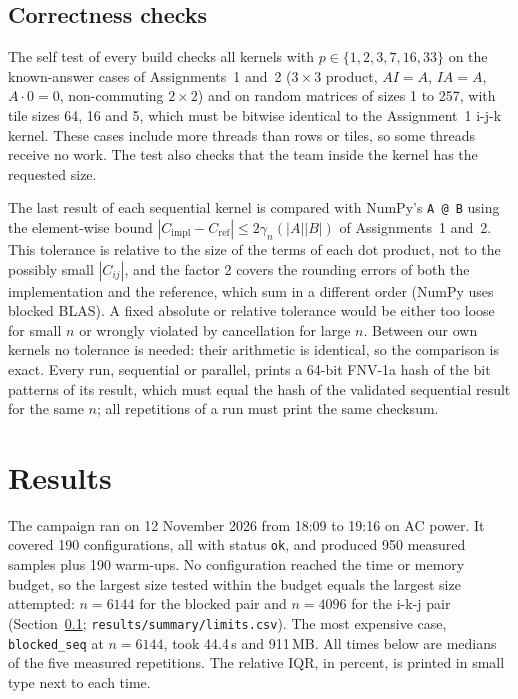 \documentclass[11pt,a4paper]{article}
\newcommand{\concept}[1]{\par\addvspace{8pt}\Needspace{5\baselineskip}%
  \noindent{\color{accent}\bfseries\boldmath #1}\par\nopagebreak\vspace{2pt}}
\begin{document}
\subsection{Correctness checks}\label{sec:correctmethod}
\concept{Before benchmarking}
The self test of every build checks all kernels with $p\in\{1,2,3,7,16,33\}$ on the
known-answer cases of Assignments~1 and~2 ($3\times3$ product, $AI=A$, $IA=A$, $A\cdot0=0$,
non-commuting $2\times2$) and on random matrices of sizes 1 to 257, with tile sizes 64, 16
and 5, which must be bitwise identical to the Assignment~1 i-j-k kernel. These cases include
more threads than rows or tiles, so some threads receive no work. The test also checks that the
team inside the kernel has the requested size.

\concept{After benchmarking}
The last result of each sequential kernel is compared with NumPy's \texttt{A @ B} using the
element-wise bound $|C_\text{impl}-C_\text{ref}|\le2\gamma_n(|A||B|)$ of Assignments~1
and~2. This tolerance is relative to the size of the terms of each dot product, not to the
possibly small $|C_{ij}|$, and the factor 2 covers the rounding errors of both the
implementation and the reference, which sum in a different order (NumPy uses blocked BLAS).
A fixed absolute or relative tolerance would be either too loose for small $n$ or wrongly
violated by cancellation for large $n$. Between our own kernels no tolerance is needed: their
arithmetic is identical, so the comparison is exact. Every run, sequential or parallel, prints a 64-bit FNV-1a hash of the bit patterns of
its result, which must equal the hash of the validated sequential result for the same $n$; all
repetitions of a run must print the same checksum.

\section{Results}

The campaign ran on 12 November 2026 from 18:09 to 19:16 on AC power. It covered 190
configurations, all with status \texttt{ok}, and produced 950 measured samples plus 190 warm-ups.
No configuration reached the time or memory budget, so the largest size tested within the
budget equals the largest size attempted: $n=6144$ for the blocked pair and $n=4096$ for the
i-k-j pair (Section~\ref{sec:correctmethod}; \texttt{results/summary/limits.csv}). The most
expensive case, \texttt{blocked\_seq} at $n=6144$, took 44.4\,s and 911\,MB. All times below are medians of the five measured
repetitions. The relative IQR, in percent, is printed in small type next to each time.
\end{document}
